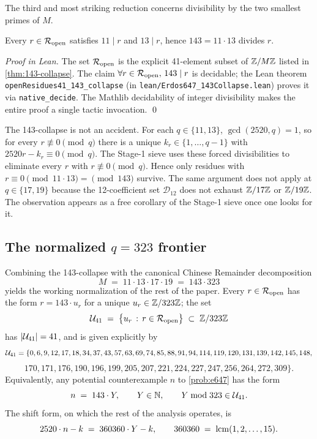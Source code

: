 The third and most striking reduction concerns divisibility by the
two smallest primes of $M$.

\begin{theorem}
\label{thm:143-collapse-restated}
Every $r \in \mathcal{R}_{\mathrm{open}}$ satisfies $11 \mid r$ and $13 \mid r$, hence
$143 = 11 \cdot 13$ divides $r$.
\end{theorem}

\begin{proof}[Proof in Lean]
The set $\mathcal{R}_{\mathrm{open}}$ is the explicit 41-element subset of $\mathbb{Z} / M\mathbb{Z}$
listed in \cref{thm:143-collapse}. The claim
$\forall r \in \mathcal{R}_{\mathrm{open}},\, 143 \mid r$ is decidable; the Lean theorem
\texttt{openResidues41\_143\_collapse} (in
\texttt{lean/Erdos647\_143Collapse.lean}) proves it via
\texttt{native\_decide}. The Mathlib decidability of integer
divisibility makes the entire proof a single tactic invocation.
\qed
\end{proof}

\begin{remark}
\label{rem:143-collapse-first-principles}
The 143-collapse is not an accident. For each $q \in \{11, 13\}$,
$\gcd(2520, q) = 1$, so for every $r \not\equiv 0 \pmod q$ there is a
unique $k_r \in \{1, \ldots, q-1\}$ with $2520 r - k_r \equiv 0 \pmod q$.
The Stage-1 sieve uses these forced divisibilities to eliminate every
$r$ with $r \not\equiv 0 \pmod q$. Hence only residues with
$r \equiv 0 \pmod{11 \cdot 13} = \pmod{143}$ survive. The same
argument does not apply at $q \in \{17, 19\}$ because the
12-coefficient set $\mathcal{D}_{12}$ does not exhaust $\mathbb{Z} / 17\mathbb{Z}$
or $\mathbb{Z} / 19\mathbb{Z}$. The observation appears as a free corollary of the
Stage-1 sieve once one looks for it.
\end{remark}

\subsection{The normalized $q = 323$ frontier}
\label{sec:q323-normalization}

Combining the 143-collapse with the canonical Chinese Remainder
decomposition
\[
M \;=\; 11 \cdot 13 \cdot 17 \cdot 19 \;=\; 143 \cdot 323
\]
yields the working normalization of the rest of the paper. Every
$r \in \mathcal{R}_{\mathrm{open}}$ has the form $r = 143 \cdot u_r$ for a unique
$u_r \in \mathbb{Z} / 323\mathbb{Z}$; the set
\[
\mathcal{U}_{41} \;=\; \bigl\{ u_r \,:\, r \in \mathcal{R}_{\mathrm{open}} \bigr\}
\;\subset\; \mathbb{Z} / 323\mathbb{Z}
\]
has $|\mathcal{U}_{41}| = 41$, and is given explicitly by
\[
\mathcal{U}_{41} = \{0, 6, 9, 12, 17, 18, 34, 37, 43, 57, 63, 69, 74, 85, 88,
91, 94, 114, 119, 120, 131, 139, 142, 145, 148,
\]
\[
170, 171, 176, 190, 196, 199, 205, 207, 221, 224, 227, 247, 256,
264, 272, 309\} .
\]
Equivalently, any potential counterexample $n$ to
\cref{prob:e647} has the form
\[
n \;=\; 143 \cdot Y , \qquad Y \in \mathbb{N} , \qquad Y \bmod 323 \in \mathcal{U}_{41}.
\]
The shift form, on which the rest of the analysis operates, is
\[
2520 \cdot n - k \;=\; 360360 \cdot Y - k , \qquad
360360 \;=\; \operatorname{lcm}(1, 2, \ldots, 15) .
\]

